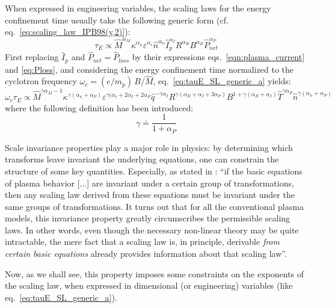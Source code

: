 When expressed in engineering variables, the scaling laws for the energy confinement time usually take the following generic form (cf. eq.~\eqref{eq:scaling_law_IPB98(y,2)}):
\begin{equation}
  \label{eq:tauE_SL_generic_a}
  \tau_E \propto \hat M^{\alpha_M} \kappa^{\alpha_\kappa} \varepsilon^{\alpha_\epsilon} \hat n^{\alpha_n} \hat I_p^{\alpha_I} R^{\alpha_R} B^{\alpha_B} \hat P_{net}^{\alpha_P}
\end{equation}
First replacing $\hat I_p$ and $\hat P_{net} = \hat P_{loss}$ by their expressions eqs.~\eqref{eqn:plasma_current} and \eqref{eq:Ploss}, and considering the energy confinement time normalized to the cyclotron frequency $\omega_c = (e/m_p)\, B/\hat M$, eq.~\eqref{eq:tauE_SL_generic_a} yields:
\begin{equation}
\label{eq:tauE_SL_generic_b}
  \omega_c \tau_E \propto 
  \hat M^{\gamma\alpha_M - 1} 
  \kappa^{\gamma(\alpha_\kappa+\alpha_P)} 
  \varepsilon^{\gamma(\alpha_\epsilon+2\alpha_I+2\alpha_P} 
  \hat q^{-\gamma\alpha_I} 
  R^{\gamma(\alpha_R+\alpha_I+3\alpha_P)} 
  B^{1 + \gamma(\alpha_B+\alpha_I)} 
  \hat T^{\gamma\alpha_P}
  \hat n^{\gamma(\alpha_n+\alpha_P)} 
\end{equation}
where the following definition has been introduced:
$$ 
  \gamma \doteq \frac{1}{1+\alpha_P}
$$

Scale invariance properties play a major role in physics: by determining which transforms leave invariant the underlying equations, one can constrain the structure of some key quantities. Especially, as stated in \cite{Connor1977}: ``if the basic equations of plasma behavior [...] are invariant under a certain group of transformations, then any scaling law derived from these equations must be invariant under the same groups of transformations. It turns out that for all the conventional plasma models, this invariance property greatly circumscribes the permissible scaling laws. In other words, even though the necessary non-linear theory may be quite intractable, the mere fact that a scaling law is, in principle, derivable \emph{from certain basic equations} already provides information about that scaling law''.

Now, as we shall see, this property imposes some constraints on the exponents of the scaling law, when expressed in dimensional (or engineering) variables (like eq.~\ref{eq:tauE_SL_generic_a}). \\

